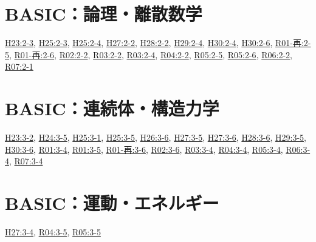 \section{BASIC：論理・離散数学}
\hyperref[q:h23-reg-basic-2-3]{H23:2-3}, \hyperref[q:h25-reg-basic-2-3]{H25:2-3}, \hyperref[q:h25-reg-basic-2-4]{H25:2-4}, \hyperref[q:h27-reg-basic-2-2]{H27:2-2}, \hyperref[q:h28-reg-basic-2-2]{H28:2-2}, \hyperref[q:h29-reg-basic-2-4]{H29:2-4}, \hyperref[q:h30-reg-basic-2-4]{H30:2-4}, \hyperref[q:h30-reg-basic-2-6]{H30:2-6}, \hyperref[q:r01-ret-basic-2-5]{R01-再:2-5}, \hyperref[q:r01-ret-basic-2-6]{R01-再:2-6}, \hyperref[q:r02-reg-basic-2-2]{R02:2-2}, \hyperref[q:r03-reg-basic-2-2]{R03:2-2}, \hyperref[q:r03-reg-basic-2-4]{R03:2-4}, \hyperref[q:r04-reg-basic-2-2]{R04:2-2}, \hyperref[q:r05-reg-basic-2-5]{R05:2-5}, \hyperref[q:r05-reg-basic-2-6]{R05:2-6}, \hyperref[q:r06-reg-basic-2-2]{R06:2-2}, \hyperref[q:r07-reg-basic-2-1]{R07:2-1}
\section{BASIC：連続体・構造力学}
\hyperref[q:h23-reg-basic-3-2]{H23:3-2}, \hyperref[q:h24-reg-basic-3-5]{H24:3-5}, \hyperref[q:h25-reg-basic-3-1]{H25:3-1}, \hyperref[q:h25-reg-basic-3-5]{H25:3-5}, \hyperref[q:h26-reg-basic-3-6]{H26:3-6}, \hyperref[q:h27-reg-basic-3-5]{H27:3-5}, \hyperref[q:h27-reg-basic-3-6]{H27:3-6}, \hyperref[q:h28-reg-basic-3-6]{H28:3-6}, \hyperref[q:h29-reg-basic-3-5]{H29:3-5}, \hyperref[q:h30-reg-basic-3-6]{H30:3-6}, \hyperref[q:r01-reg-basic-3-4]{R01:3-4}, \hyperref[q:r01-reg-basic-3-5]{R01:3-5}, \hyperref[q:r01-ret-basic-3-6]{R01-再:3-6}, \hyperref[q:r02-reg-basic-3-6]{R02:3-6}, \hyperref[q:r03-reg-basic-3-4]{R03:3-4}, \hyperref[q:r04-reg-basic-3-4]{R04:3-4}, \hyperref[q:r05-reg-basic-3-4]{R05:3-4}, \hyperref[q:r06-reg-basic-3-4]{R06:3-4}, \hyperref[q:r07-reg-basic-3-4]{R07:3-4}
\section{BASIC：運動・エネルギー}
\hyperref[q:h27-reg-basic-3-4]{H27:3-4}, \hyperref[q:r04-reg-basic-3-5]{R04:3-5}, \hyperref[q:r05-reg-basic-3-5]{R05:3-5}
